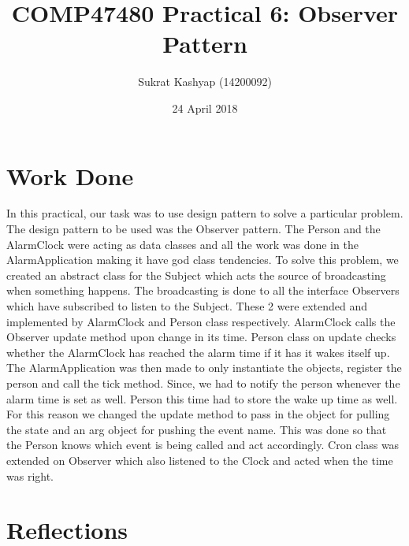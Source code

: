 \documentclass[12pt]{article}
\title{\vspace{-3.0cm}COMP47480 Practical 6: Observer Pattern}
\author{Sukrat Kashyap (14200092)}
\date{24 April 2018}
\begin{document}
\maketitle

\section{Work Done}

In this practical, our task was to use design pattern to solve a particular problem. The design pattern to be used was the Observer pattern. The Person and the AlarmClock were acting as data classes and all the work was done in the AlarmApplication making it have god class tendencies. To solve this problem, we created an abstract class for the Subject which acts the source of broadcasting when something happens. The broadcasting is done to all the interface Observers which have subscribed to listen to the Subject. These 2 were extended and implemented by AlarmClock and Person class respectively. AlarmClock calls the Observer update method upon change in its time. Person class on update checks whether the AlarmClock has reached the alarm time if it has it wakes itself up. The AlarmApplication was then made to only instantiate the objects, register the person and call the tick method. Since, we had to notify the person whenever the alarm time is set as well. Person this time had to store the wake up time as well. For this reason we changed the update method to pass in the object for pulling the state and an arg object for pushing the event name. This was done so that the Person knows which event is being called and act accordingly. Cron class was extended on Observer which also listened to the Clock and acted when the time was right.

\section{Reflections}
\end{document}
